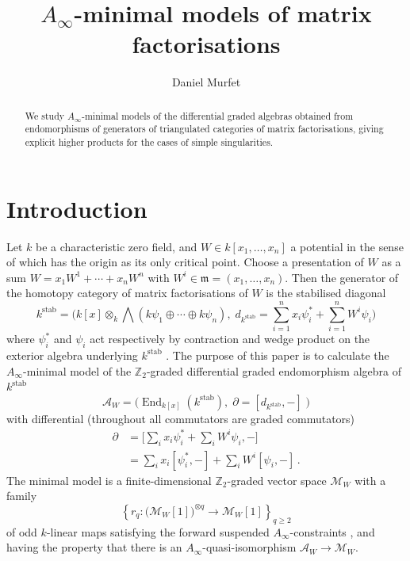 \documentclass[english,letter paper,12pt,leqno]{article}
\theoremstyle{example}
\numberwithin{equation}{section}
\def\res{\operatorname{Res}}
\def\stab{\operatorname{stab}}
\def\be{\begin{equation}}
\def\ee{\end{equation}}
\def\nZ{\mathds{Z}}
\DeclareMathOperator{\End}{End}
\begin{document}
\def\Res{\res\!}
\newcommand{\ud}{\mathrm{d}}
\newcommand{\Ress}[1]{\res_{#1}\!}
\newcommand{\cat}[1]{\mathcal{#1}}
\newcommand{\lto}{\longrightarrow}
\newcommand{\xlto}[1]{\stackrel{#1}\lto}
\newcommand{\mf}[1]{\mathfrak{#1}}
\newcommand{\md}[1]{\mathscr{#1}}
\def\sus{\l}
\def\l{\,|\,}
\def\sgn{\textup{sgn}}

\title{$A_\infty$-minimal models of matrix factorisations}
\author{Daniel Murfet}

\maketitle

\begin{abstract}
We study $A_\infty$-minimal models of the differential graded algebras obtained from endomorphisms of generators of triangulated categories of matrix factorisations, giving explicit higher products for the cases of simple singularities. 
\end{abstract}

\section{Introduction}

Let $k$ be a characteristic zero field, and $W \in k[x_1,\ldots,x_n]$ a potential in the sense of \cite[\S 2.2]{lgdual} which has the origin as its only critical point. Choose a presentation of $W$ as a sum $W = x_1 W^1 + \cdots + x_n W^n$ with $W^i \in \mf{m} = (x_1,\ldots,x_n)$. Then the generator of the homotopy category of matrix factorisations of $W$ is the stabilised diagonal
\begin{equation}\label{eq:kstab}
k^{\operatorname{stab}} = \Big( k[x] \otimes_k \bigwedge( k\psi_1 \oplus \cdots \oplus k \psi_n ), \;d_{k^{\stab}} = \sum_{i=1}^n x_i \psi_i^* + \sum_{i=1}^n W^i \psi_i \Big)
\end{equation}
where $\psi_i^*$ and $\psi_i$ act respectively by contraction and wedge product on the exterior algebra underlying $k^{\stab}$ \cite{d0904.4713}. The purpose of this paper is to calculate the $A_\infty$-minimal model of the $\nZ_2$-graded differential graded endomorphism algebra of $k^{\operatorname{\stab}}$
\be\label{eq:defnaw}
\md{A}_W = \Big( \End_{k[x]}(k^{\operatorname{stab}}), \; \partial = [d_{k^{\stab}},-] \; \Big)
\ee 
with differential (throughout all commutators are graded commutators)
\begin{align}
\partial &= \Big[\sum_i x_i \psi_i^* + \sum_i W^i \psi_i, -\Big]\\
&= \sum_i x_i [\psi_i^*,-] + \sum_i W^i [\psi_i,-]\,.
\end{align}
The minimal model is a finite-dimensional $\nZ_2$-graded vector space $\md{M}_W$ with a family 
\[
\left\{ r_q: \big(\md{M}_W[1]\big)^{\otimes q} \lto \md{M}_W[1] \right\}_{q \ge 2}
\]
of odd $k$-linear maps satisfying the forward suspended $A_\infty$-constraints \cite{lazaroiu}, and having the property that there is an $A_\infty$-quasi-isomorphism $\md{A}_W \lto \md{M}_W$.
\end{document}
